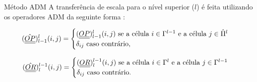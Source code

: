\documentclass[professionalfont]{beamer}
\begin{document}
    


\begin{frame}{Método ADM}
    \small
    A transferência de escala para o nível superior ($l$) é feita utilizando os operadores ADM da seguinte forma \cite{Cusini2016}:

    \begin{equation}
        \label{eq:multinivel.1}
    (\hat{\underline{\underline{OP}}})^{l}_{l-1} (i,j) =
        \begin{cases}
            (\underline{\underline{OP}})^{l}_{l-1} (i,j) \text{ se a célula } i \in \Gamma^{l-1} \text{ e a célula } j \in \hat{\Pi}^{l}\\
            \delta_{ij} \text{ caso contrário},\\
        \end{cases}
    \end{equation}

    \begin{equation}
        \label{eq:multinivel.2}
    (\hat{\underline{\underline{OR}}})^{l-1}_{l} (i,j) =
        \begin{cases}
            (\underline{\underline{OR}})^{l-1}_{l} (i,j) \text{ se a célula } i \in \Gamma^{l} \text{ e a célula } j \in \Gamma^{l-1}\\
            \delta_{ij} \text{ caso contrário}.\\
        \end{cases}
    \end{equation}

\end{frame}
\end{document}
